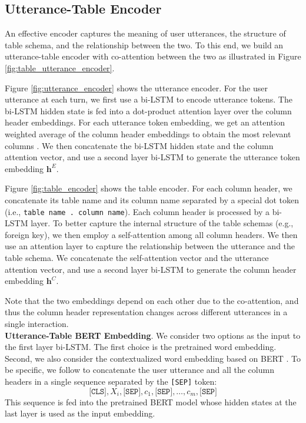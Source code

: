 \documentclass[11pt,a4paper]{article}
\newcommand{\newvec}[1]{\mathbf{#1}}
\begin{document}
\subsection{Utterance-Table Encoder}
\label{sec:utterance-table-encoder}
An effective encoder captures the meaning of user utterances, the structure of table schema, and the relationship between the two.
To this end, we build an utterance-table encoder with co-attention between the two as illustrated in Figure \ref{fig:table_utterance_encoder}.

Figure \ref{fig:utterance_encoder} shows the utterance encoder.
For the user utterance at each turn, we first use a bi-LSTM to encode utterance tokens.
The bi-LSTM hidden state is fed into a dot-product attention layer \cite{luong2015effective} over the column header embeddings.
For each utterance token embedding, we get an attention weighted average of the column header embeddings to obtain the most relevant columns \cite{dong2018coarse}.
We then concatenate the bi-LSTM hidden state and the column attention vector, and use a second layer bi-LSTM to generate the utterance token embedding $\newvec{h}^{E}$.

Figure \ref{fig:table_encoder} shows the table encoder.
For each column header, we concatenate its table name and its column name separated by a special dot token (i.e., \texttt{table name . column name}).
Each column header is processed by a bi-LSTM layer.
To better capture the internal structure of the table schemas (e.g., foreign key), we then employ a self-attention \cite{vaswani2017attention} among all column headers.
We then use an attention layer to capture the relationship between the utterance and the table schema.
We concatenate the self-attention vector and the utterance attention vector, and use a second layer bi-LSTM to generate the column header embedding $\newvec{h}^{C}$.

Note that the two embeddings depend on each other due to the co-attention, and thus the column header representation changes across different utterances in a single interaction.
\\\noindent
\textbf{Utterance-Table BERT Embedding}. We consider two options as the input to the first layer bi-LSTM.
The first choice is the pretrained word embedding.
Second, we also consider the contextualized word embedding based on BERT \cite{devlin2019bert}.
To be specific, we follow  to concatenate the user utterance and all the column headers in a single sequence separated by the \texttt{[SEP]} token:
\begin{equation*}
    \texttt{[CLS]},X_i,\texttt{[SEP]}, c_1, \texttt{[SEP]}, \dots, c_m, \texttt{[SEP]}
\end{equation*}
This sequence is fed into the pretrained BERT model whose hidden states at the last layer is used as the input embedding.
\end{document}
